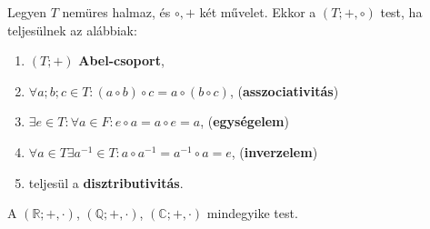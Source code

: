 \begin{definition}[Test]
  Legyen $T$ nemüres halmaz, és $\circ, +$ két művelet. Ekkor a $(T; +, \circ)$
  test, ha teljesülnek az alábbiak:
  \begin{enumerate}
    \item $(T; +)$ \textbf{Abel-csoport},

    \item $\forall a; b; c \in T: (a \circ b) \circ c = a \circ (b \circ c)$,
          \hfill (\textbf{asszociativitás})

    \item $\exists e \in T: \forall a \in F: e \circ a = a \circ e = a$,
          \hfill (\textbf{egységelem})

    \item $\forall a \in T \exists a^{-1} \in T:
            a \circ a^{-1} = a^{-1} \circ a = e$,
          \hfill (\textbf{inverzelem})

    \item teljesül a \textbf{disztributivitás}.

  \end{enumerate}
\end{definition}

\begin{example}
  A $(\mathbb R; +, \cdot)$, $(\mathbb Q; +, \cdot)$, $(\mathbb C; +, \cdot)$
  mindegyike test.
\end{example}

